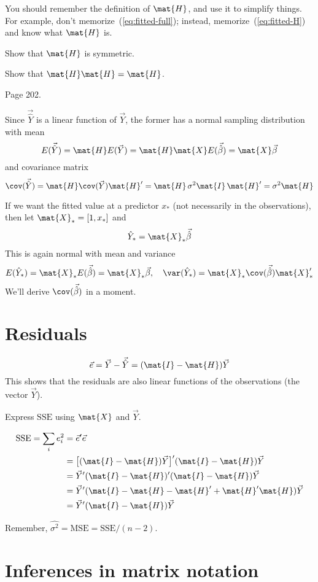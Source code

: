 \documentclass[12pt]{article}
\begin{document}
You should remember the definition of
$\mat{H}$, and use it to simplify things.
For example,
don't memorize~(\ref{eq:fitted-full});
instead, memorize~(\ref{eq:fitted-H}) and know what $\mat{H}$ is.

\exercise%
Show that $\mat{H}$ is symmetric.

\exercise%
Show that $\mat{H}\mat{H} = \mat{H}$.

\example Page 202.

Since $\vec{\hat{Y}}$ is a linear function of $\vec{Y}$,
the former has a normal sampling distribution with mean
\[
E(\vec{\hat{Y}})
= \mat{H}E(\vec{Y})
= \mat{H}\mat{X}E(\vec{\hat\beta})
= \mat{X}\vec{\beta}
\]
and covariance matrix
\[
\cov(\vec{\hat{Y}})
= \mat{H}\cov(\vec{Y})\mat{H}'
= \mat{H}\, \sigma^2 \mat{I}\, \mat{H}'
= \sigma^2\mat{H}
\]

If we want the fitted value at a predictor $x_*$
(not necessarily in the observations),
then let $\mat{X}_* = [1, x_*]$ and
\[
\hat{Y}_* = \mat{X}_* \vec{\hat\beta}
\]
This is again normal with mean and variance
\[
E(\hat{Y}_*)
= \mat{X}_* E(\vec{\hat\beta})
= \mat{X}_* \vec{\beta}
,\quad
\var(\hat{Y}_*)
= \mat{X}_* \cov(\vec{\hat\beta}) \mat{X}_*'
\]
We'll derive $\cov(\vec{\hat\beta})$ in a moment.

\section{Residuals}

\[
\vec{e} = \vec{Y} - \vec{\hat{Y}} = (\mat{I} - \mat{H}) \vec{Y}
\]
This shows that the residuals are also linear functions of the
observations (the vector $\vec{Y}$).

\exercise%
Express $\text{SSE}$ using $\mat{X}$ and $\vec{Y}$.

\begin{align*}
\text{SSE}
= \sum_i e_i^2
&= \vec{e}'\vec{e}
\\
&= \bigl[(\mat{I} - \mat{H})\vec{Y}\bigl]' (\mat{I} - \mat{H})\vec{Y}
\\
&= \vec{Y}'(\mat{I} - \mat{H})' (\mat{I} - \mat{H}) \vec{Y}
\\
&= \vec{Y}' (\mat{I} - \mat{H} - \mat{H}' + \mat{H}'\mat{H}) \vec{Y}
\\
&= \vec{Y}' (\mat{I} - \mat{H}) \vec{Y}
\end{align*}

Remember,
$\hat{\sigma^2} = \text{MSE} = \text{SSE} / (n-2)$.

\section{Inferences in matrix notation}
\end{document}
